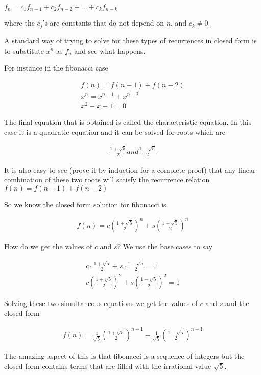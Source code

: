 \documentclass[12pt]{article}
\begin{document}
$f_n = c_1f_{n-1}+ c_2f_{n-2} + \ldots + c_kf_{n-k}$

where the $c_j$'s are constants that do not depend on $n$, and $c_k \neq  0$.

A standard way of trying to solve for these types of recurrences in closed form is to substitute $x^n$ as $f_n$ and see what happens.

For instance in the fibonacci case

\begin{align*}
f(n) = f(n-1) + f(n-2) \\
x^n = x^{n-1} + x^{n-2} \\
x^2 - x -1 = 0
\end{align*}

The final equation that is obtained is called the characteristic equation. In this case it is a quadratic equation and it can be solved for roots which are 

\begin{align*}
\frac{1 + \sqrt{5}}{2} and \frac{1 - \sqrt{5}}{2}
\end{align*}

It is also easy to see (prove it by induction for a complete proof) that any linear combination of these two roots will satisfy the recurrence relation $f(n) = f(n-1) + f(n-2)$

So we know the closed form solution for fibonacci is 

\begin{align*}
f(n) = c \left(\frac{1 + \sqrt{5}}{2} \right)^n + s \left(\frac{1 - \sqrt{5}}{2} \right)^n
\end{align*}

How do we get the values of $c$ and $s$? We use the base cases to say

\begin{align*}
c \cdot \frac{1 + \sqrt{5}}{2} + s \cdot \frac{1 - \sqrt{5}}{2} = 1 \\
c\left(\frac{1 + \sqrt{5}}{2}\right)^2 + s\left(\frac{1 - \sqrt{5}}{2}\right)^2 = 1 
\end{align*}

Solving these two simultaneous equations we get the values of $c$ and $s$ and the closed form

\begin{align*}
f(n) = \frac{1}{\sqrt{5}}\left(\frac{1 + \sqrt{5}}{2}\right)^{n+1} - \frac{1}{\sqrt{5}}\left(\frac{1 - \sqrt{5}}{2}\right)^{n+1}
\end{align*}

The amazing aspect of this is that fibonacci is a sequence of integers but the closed form contains terms that are filled with the irrational value $\sqrt{5}$.
\end{document}
